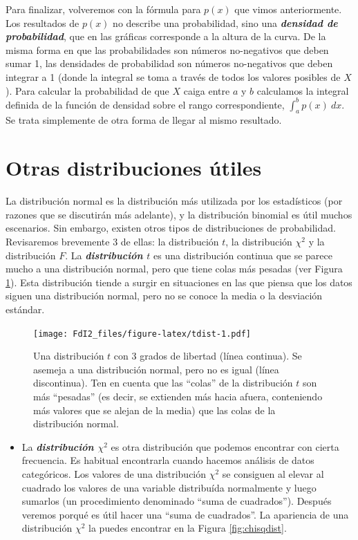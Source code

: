 \documentclass[spanish,]{book}
\providecommand{\tightlist}{%
  \setlength{\itemsep}{0pt}\setlength{\parskip}{0pt}}
\begin{document}
Para finalizar, volveremos con la fórmula para \(p(x)\) que vimos
anteriormente. Los resultados de \(p(x)\) no describe una probabilidad,
sino una \textbf{\emph{densidad de probabilidad}}, que en las gráficas
corresponde a la altura de la curva. De la misma forma en que las
probabilidades son números no-negativos que deben sumar 1, las
densidades de probabilidad son números no-negativos que deben integrar a
1 (donde la integral se toma a través de todos los valores posibles de
\(X\)). Para calcular la probabilidad de que \(X\) caiga entre \(a\) y
\(b\) calculamos la integral definida de la función de densidad sobre el
rango correspondiente, \(\int_a^b p(x) \ dx\). Se trata simplemente de
otra forma de llegar al mismo resultado.

\section{Otras distribuciones útiles}\label{otherdists}

La distribución normal es la distribución más utilizada por los
estadísticos (por razones que se discutirán más adelante), y la
distribución binomial es útil muchos escenarios. Sin embargo, existen
otros tipos de distribuciones de probabilidad. Revisaremos brevemente 3
de ellas: la distribución \(t\), la distribución \(\chi^2\) y la
distribución \(F\). La \textbf{\emph{distribución \(t\)}} es una
distribución continua que se parece mucho a una distribución normal,
pero que tiene colas más pesadas (ver Figura \ref{fig:tdist}). Esta
distribución tiende a surgir en situaciones en las que piensa que los
datos siguen una distribución normal, pero no se conoce la media o la
desviación estándar.

\begin{figure}
\centering
\texttt{[image: FdI2\_files/figure-latex/tdist-1.pdf]}
\caption{\label{fig:tdist}Una distribución \(t\) con 3 grados de libertad
(línea continua). Se asemeja a una distribución normal, pero no es igual
(línea discontinua). Ten en cuenta que las ``colas'' de la distribución
\(t\) son más ``pesadas'' (es decir, se extienden más hacia afuera,
conteniendo más valores que se alejan de la media) que las colas de la
distribución normal.}
\end{figure}

\begin{itemize}
\tightlist
\item
  La \textbf{\emph{distribución \(\chi^2\)}} es otra distribución que
  podemos encontrar con cierta frecuencia. Es habitual encontrarla
  cuando hacemos análisis de datos categóricos. Los valores de una
  distribución \(\chi^2\) se consiguen al elevar al cuadrado los valores
  de una variable distribuída normalmente y luego sumarlos (un
  procedimiento denominado ``suma de cuadrados''). Después veremos
  porqué es útil hacer una ``suma de cuadrados''. La apariencia de una
  distribución \(\chi^2\) la puedes encontrar en la Figura
  \ref{fig:chisqdist}.
\end{itemize}
\end{document}
